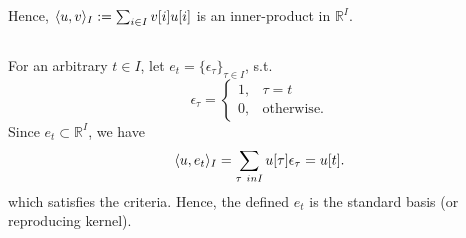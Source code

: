 Hence, $\langle u, v \rangle_I := \sum_{i \in I} v[i]u[i]$ is an inner-product in $\mathbb{R}^I$.

\subsection{}\label{subsec:p4-f}
For an arbitrary $t \in I$, let $e_t = \{\epsilon_\tau\}_{\tau \in I}$, s.t.
\[
\epsilon_\tau = \begin{cases}
1, &\tau = t\\
0, &\text{otherwise}.
\end{cases}
\]
Since $e_t \subset \mathbb{R}^I$, we have
\[\innerprod{u}{e_t}_I = \sum_{\tau \ in I} u[\tau] \epsilon_\tau = u[t].\]
which satisfies the criteria. Hence, the defined $e_t$ is the standard basis (or reproducing kernel).